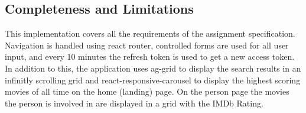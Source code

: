 \documentclass[12pt,a4paper]{article}
\begin{document}
			\begin{center}
			\end{center}
		
		\subsection{Completeness and Limitations}
			This implementation covers all the requirements of the assignment specification. 
			Navigation is handled using react router, controlled forms are used for all user input, and 
			every 10 minutes the refresh token is used to get a new access token. In addition to this, 
			the application uses ag-grid to display the search results in an infinitly scrolling grid 
			and react-responsive-carousel to display the highest scoring movies of all time on the 
			home (landing) page. On the person page the movies the person is involved in are displayed 
			in a grid with the IMDb Rating.\\
\end{document}
